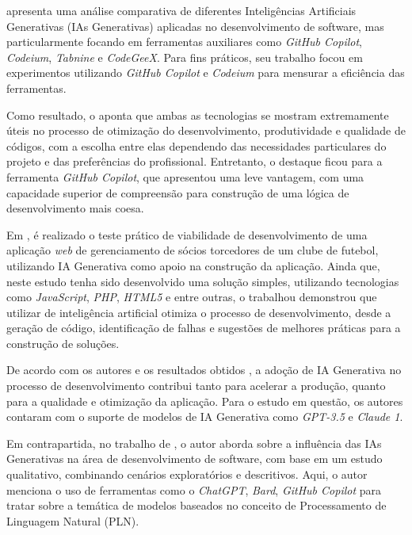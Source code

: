 \documentclass[english,brazilian]{UNISINOSartigo} %
\begin{document}
 apresenta uma análise comparativa de diferentes Inteligências Artificiais Generativas (IAs Generativas) aplicadas no desenvolvimento de software, mas particularmente focando em ferramentas auxiliares como \textit{GitHub Copilot}, \textit{Codeium}, \textit{Tabnine} e \textit{CodeGeeX}. Para fins práticos, seu trabalho focou em experimentos utilizando \textit{GitHub Copilot} e \textit{Codeium} para mensurar a eficiência das ferramentas.

Como resultado, o  aponta que ambas as tecnologias se mostram extremamente úteis no processo de otimização do desenvolvimento, produtividade e qualidade de códigos, com a escolha entre elas dependendo das necessidades particulares do projeto e das preferências do profissional. Entretanto, o destaque ficou para a ferramenta \textit{GitHub Copilot}, que apresentou uma leve vantagem, com uma capacidade superior de compreensão para construção de uma lógica de desenvolvimento mais coesa.

Em , é realizado o teste prático de viabilidade de desenvolvimento de uma aplicação \textit{web} de gerenciamento de sócios torcedores de um clube de futebol, utilizando IA Generativa como apoio na construção da aplicação. Ainda que, neste estudo tenha sido desenvolvido uma solução simples, utilizando tecnologias como \textit{JavaScript}, \textit{PHP}, \textit{HTML5} e entre outras, o trabalhou demonstrou que utilizar de inteligência artificial otimiza o processo de desenvolvimento, desde a geração de código, identificação de falhas e sugestões de melhores práticas para a construção de soluções.

De acordo com os autores e os resultados obtidos \cite{daSilva2025}, a adoção de IA Generativa no processo de desenvolvimento contribui tanto para acelerar a produção, quanto para a qualidade e otimização da aplicação. Para o estudo em questão, os autores contaram com o suporte de modelos de IA Generativa como \textit{GPT-3.5} e \textit{Claude 1}.

Em contrapartida, no trabalho de , o autor aborda sobre a influência das IAs Generativas na área de desenvolvimento de software, com base em um estudo qualitativo, combinando cenários exploratórios e descritivos. Aqui, o autor menciona o uso de ferramentas como o \textit{ChatGPT}, \textit{Bard}, \textit{GitHub Copilot} para tratar sobre a temática de modelos baseados no conceito de Processamento de Linguagem Natural (PLN).
\end{document}
